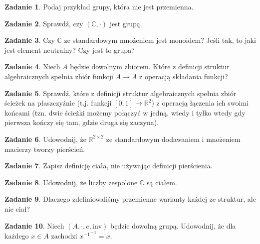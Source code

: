 \documentclass{article}
\theoremstyle{definition}
\newtheorem{exercise}{Zadanie}[section]
\begin{document}
\begin{exercise}
	Podaj przykład grupy, która nie jest przemienna.
\end{exercise}

\begin{exercise}
	Sprawdź, czy $(\mathbb{C}, \cdot)$ jest grupą.
\end{exercise}

\begin{exercise}
	Czy $\mathbb{C}$ ze standardowym mnożeniem jest monoidem? Jeśli tak, to jaki jest element neutralny? Czy jest to grupa?
\end{exercise}

\begin{exercise}
	Niech $A$ będzie dowolnym zbiorem.
	Które z definicji struktur algebraicznych spełnia zbiór funkcji $A \to A$ z operacją składania funkcji?
\end{exercise}

\begin{exercise}
	Sprawdź,
		które z definicji struktur algebraicznych spełnia zbiór ścieżek na płaszczyźnie
		(t.j. funkcji $[0, 1] \to \mathbb{R}^2$) z operacją łączenia ich swoimi końcami
		(tzn. dwie ścieżki możemy połączyć w jedną,
			wtedy i tylko wtedy gdy pierwsza kończy się tam,
			gdzie druga się zaczyna).
\end{exercise}

\begin{exercise}
	Udowodnij,
		że $\mathbb{R}^{2 \times 2}$ ze standardowym dodawaniem i mnożeniem macierzy tworzy pierścień.
\end{exercise}

\begin{exercise}
	Zapisz definicję ciała, nie używając definicji pierścienia.
\end{exercise}

\begin{exercise}
	Udowodnij, że liczby zespolone $\mathbb{C}$ są ciałem.
\end{exercise}

\begin{exercise}
	Dlaczego zdefiniowaliśmy przemienne warianty każdej ze struktur, ale nie ciał?
\end{exercise}

\begin{exercise}
    Niech $(A, \cdot, e, \mathrm{inv})$ będzie dowolną grupą.
    Udowodnij, że dla każdego $x \in A$ zachodzi ${x^{-1}}^{-1} = x$.
\end{exercise}
\end{document}
